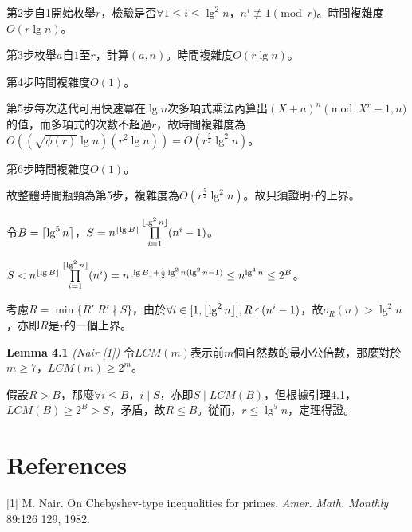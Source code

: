 \documentclass{article}
\DeclarePairedDelimiter\ceil{\lceil}{\rceil}
\DeclarePairedDelimiter\floor{\lfloor}{\rfloor}
\newcommand{\nequiv}{\not\equiv}
\begin{document}
    第2步自1開始枚舉$r$，檢驗是否$\forall 1\leq i\leq\lg^2n$，$n^i\nequiv 1\pmod{r}$。時間複雜度$O(r\lg n)$。

    第3步枚舉$a$自$1$至$r$，計算$(a,n)$。時間複雜度$O(r\lg n)$。

    第4步時間複雜度$O(1)$。

    第5步每次迭代可用快速冪在$\lg n$次多項式乘法內算出$(X+a)^n\pmod{X^r-1, n}$的值，而多項式的次數不超過$r$，故時間複雜度為$O((\sqrt{\phi(r)}\lg n)(r^2\lg n))=O(r^{\frac{5}{2}}\lg^2n)$。

    第6步時間複雜度$O(1)$。

    故整體時間瓶頸為第5步，複雜度為$O(r^{\frac{5}{2}}\lg^2n)$。故只須證明$r$的上界。

    令$B=\ceil{\lg^5n}$，$S=n^{\floor{\lg B}}\prod\limits_{i=1}^{\floor{\lg^2n}}(n^i-1)$。

    $S<n^{\floor{\lg B}}\prod\limits_{i=1}^{\floor{\lg^2n}}(n^i)=n^{\floor{\lg B}+\frac{1}{2}\lg^2n(\lg^2n-1)}\leq n^{\lg^4n}\leq 2^B$。

    考慮$R=\min\{R'|R'\nmid S\}$，由於$\forall i\in[1, \floor{\lg^2n}], R\nmid(n^i-1)$，故$o_R(n)>\lg^2n$，亦即$R$是$r$的一個上界。

\begin{mdframed}
\noindent\textbf{Lemma 4.1} \textit{(Nair [1])} 令$LCM(m)$表示前$m$個自然數的最小公倍數，那麼對於$m\geq 7$，$LCM(m)\geq 2^m$。
\end{mdframed}

    假設$R>B$，那麼$\forall i\leq B$，$i\mid S$，亦即$S\mid LCM(B)$，但根據引理4.1，$LCM(B)\geq 2^B>S$，矛盾，故$R\leq B$。從而，$r\leq \lg^5n$，定理得證。

\section{References}

    [1] M. Nair. On Chebyshev-type inequalities for primes. \textit{Amer. Math. Monthly} 89:126 129, 1982.
    
\end{document}
